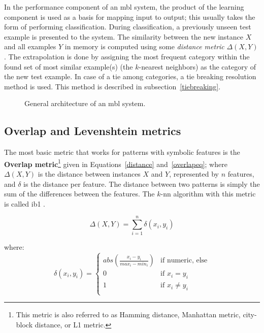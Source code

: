 \documentclass{report}
\begin{document}
In the performance component of an {\sc mbl} system, the product of
the learning component is used as a basis for mapping input to output;
this usually takes the form of performing classification.  During
classification, a previously unseen test example is presented to the
system. The similarity between the new instance $X$ and all examples
$Y$ in memory is computed using some {\em distance metric}
$\Delta(X,Y)$. The extrapolation is done by assigning the most
frequent category within the found set of most similar example(s) (the
$k$-nearest neighbors) as the category of the new test example. In
case of a tie among categories, a tie breaking resolution method is
used. This method is described in subsection~\ref{tiebreaking}.

\begin{figure}[htb]
        \begin{center}
                \leavevmode
                \epsfxsize=8cm
                \caption{General architecture of an {\sc mbl} system.
                }
                \label{mbl-method}
        \end{center}
\end{figure}

\subsection{Overlap and Levenshtein metrics}
\label{overlap}

The most basic metric that works for patterns with symbolic features
is the {\bf Overlap metric}\footnote{This metric is also referred to
as Hamming distance, Manhattan metric, city-block distance, or L1
metric.} given in Equations~\ref{distance} and~\ref{overlapeq}; where
$\Delta(X,Y)$ is the distance between instances $X$ and $Y$,
represented by $n$ features, and $\delta$ is the distance per
feature. The distance between two patterns is simply the sum of the
differences between the features. The $k$-{\sc nn} algorithm with this
metric is called {\sc ib1} \cite{Aha+91}. 

\begin{equation}
\Delta(X,Y) = \sum_{i=1}^{n} \delta(x_{i},y_{i})
\label{distance}
\end{equation}

where:
\begin{equation}
\delta(x_{i}, y_{i}) = \left\{ \begin{array}{ll}
		abs(\frac{x_{i}-y_{i}}{max_{i}-min_{i}}) & \mbox{if numeric, else}\\
		0 & \mbox{if $x_{i} = y_{i}$}\\
		1 & \mbox{if $x_{i} \neq y_{i}$}\\
	\end{array} \right.
\label{overlapeq}
\end{equation}
\end{document}
